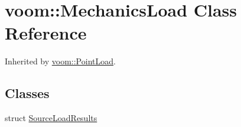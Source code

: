 \hypertarget{classvoom_1_1_mechanics_load}{
\section{voom::MechanicsLoad Class Reference}
\label{classvoom_1_1_mechanics_load}
}


Inherited by \hyperlink{classvoom_1_1_point_load}{voom::PointLoad}.\subsection*{Classes}
\begin{DoxyCompactItemize}
\item 
struct \hyperlink{structvoom_1_1_mechanics_load_1_1_source_load_results}{SourceLoadResults}
\end{DoxyCompactItemize}
